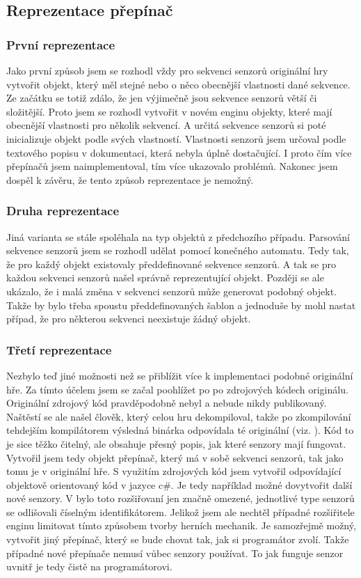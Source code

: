 \subsection{Reprezentace přepínač}
\subsubsection{První reprezentace}
Jako první způsob jsem se rozhodl vždy pro sekvenci senzorů originální hry vytvořit objekt, který měl stejné nebo o něco obecnější vlastnosti dané sekvence.
Ze začátku se totiž zdálo, že jen výjimečně jsou sekvence senzorů větší či složitější. Proto jsem se rozhodl vytvořit v
novém enginu objekty, které mají obecnější vlastnosti pro několik sekvencí. A určitá sekvence senzorů si poté
inicializuje objekt podle svých vlastností. Vlastnosti senzorů jsem určoval podle textového popisu v dokumentaci, která nebyla úplně dostačující. 
I proto čím více přepínačů jsem naimplementoval, tím více ukazovalo problémů. Nakonec jsem dospěl k závěru, že tento způsob reprezentace je nemožný.

\subsubsection{Druha reprezentace}
Jiná varianta se stále spoléhala na typ objektů z předchozího případu. Parsování sekvence senzorů jsem se rozhodl udělat pomocí konečného 
automatu. Tedy tak,  že pro každý objekt existovaly předdefinované sekvence senzorů. A tak se pro každou sekvenci senzorů našel správně 
reprezentující objekt. Později se ale ukázalo, že i malá změna v sekvenci senzorů může generovat podobný objekt. Takže by bylo třeba
spoustu předdefinovaných šablon a jednoduše by mohl nastat případ, že pro některou sekvenci neexistuje žádný objekt.

\subsubsection{Třetí reprezentace}
Nezbylo teď jiné možnosti než se přiblížit více k implementaci podobné originální hře. Za tímto účelem jsem se začal poohlížet po 
po zdrojových kódech originálu. Originální zdrojový kód pravděpodobně nebyl a nebude nikdy publikovaný. Naštěstí  se ale našel člověk,
který celou hru dekompiloval, takže po zkompilování tehdejším kompilátorem výsledná binárka odpovídala té originální (viz. \citet{DMDekompilation}).
Kód to je sice těžko čitelný, ale obsahuje přesný popis, jak které senzory mají fungovat. Vytvořil jsem tedy objekt přepínač, který má v sobě sekvenci senzorů, tak jako
tomu je v originální hře. S využitím zdrojových kód jsem vytvořil odpovídající objektově orientovaný kód v jazyce c\#. Je tedy například možné 
dovytvořit další nové senzory. V bylo toto rozšiřovaní jen značně omezené, jednotlivé type senzorů se odlišovali číselným identifikátorem.
Jelikož jsem ale nechtěl případné rozšiřitele enginu limitovat tímto způsobem tvorby herních mechanik. Je samozřejmě možný, vytvořit jiný přepínač, který se bude
chovat tak, jak si programátor zvolí. Takže případné nové přepínače nemusí vůbec senzory používat. To jak funguje senzor uvnitř je tedy čistě na
programátorovi.

